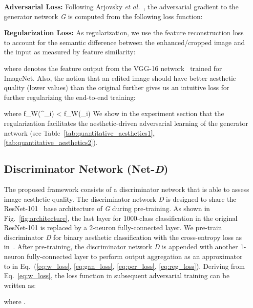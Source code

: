 \documentclass[sigconf]{acmart}
\newcommand{\etal}{\textit{et al.}}
\begin{document}
\noindent\textbf{Adversarial Loss:}
Following Arjovsky \etal~\cite{arjovsky2017wasserstein}, the adversarial gradient to the generator network \textit{G} is computed from the following loss function:


\noindent\textbf{Regularization Loss:}
As regularization, we use the feature reconstruction loss~\cite{johnson2016perceptual} to account for the semantic difference between the enhanced/cropped image and the input as measured by feature similarity:

where  denotes the  feature output from the VGG-16 network~\cite{simonyan2014very} trained for ImageNet. Also, the notion that an edited image should have better aesthetic quality (lower  values) than the original further gives us an intuitive loss for further regularizing the end-to-end training:

where  f_{W}(^{}_{i}) < f_{W}(_{i}) 
\vskip 0.2cm
\noindent We show in the experiment section that the regularization facilitates the aesthetic-driven adversarial learning of the generator network (see Table~\ref{tab:quantitative_aesthetics1}, \ref{tab:quantitative_aesthetics2}).





\subsection{Discriminator Network (Net-\textit{D})}
\label{sec:discriminator_network}
The proposed framework consists of a discriminator network that is able to assess image aesthetic quality. The discriminator network \textit{D} is designed to share the ResNet-101~\cite{he2016deep} base architecture of \textit{G} during pre-training. As shown in Fig.~\ref{fig:architecture}, the last layer for 1000-class classification in the original ResNet-101 is replaced by a 2-neuron fully-connected layer. We pre-train discriminator \textit{D} for binary aesthetic classification with the cross-entropy loss as in~\cite{deng2017image}.
After pre-training, the discriminator network \textit{D} is appended with another 1-neuron fully-connected layer to perform output aggregation as an approximator to  in Eq.~(\ref{eq:w_loss}, \ref{eq:gan_loss}, \ref{eq:per_loss}, \ref{eq:reg_loss}). Deriving from Eq.~\ref{eq:w_loss}, the loss function  in subsequent adversarial training can be written as:

where .
\end{document}
